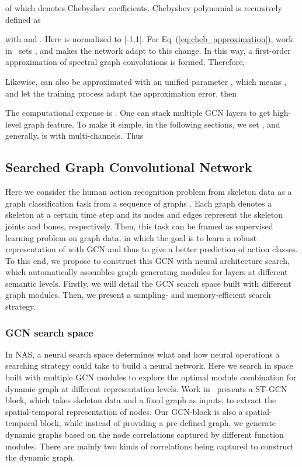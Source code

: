 \documentclass[letterpaper]{article} \usepackage{aaai19}  \usepackage{times}  \usepackage{helvet} \usepackage{courier}  \usepackage[hyphens]{url}  \usepackage{graphicx} \urlstyle{rm} \def\UrlFont{\rm}  \usepackage{graphicx}  \frenchspacing  \setlength{\pdfpagewidth}{8.5in}  \setlength{\pdfpageheight}{11in}
\begin{document}
\noindent of which  denotes Chebyshev coefficients. Chebyshev polynomial  is recursively defined as

 with  and . Here  is normalized to [-1,1]. For Eq~(\ref{eq:cheb_approximation}), work in~\cite{kipf2016semi} sets ,  and makes the network adapt to this change. In this way, a first-order approximation of spectral graph convolutions is formed. Therefore, 


\noindent Likewise,  can also be approximated with an unified parameter , which means , and let the training process adapt the approximation error, then 

The computational expense is . One can stack multiple GCN layers to get high-level graph feature. To make it simple, in the following sections, we set  , and generally,  is with multi-channels. Thus 





\subsection{Searched Graph Convolutional Network}
Here we consider the human action recognition problem from skeleton data as a graph classification task from a sequence of graphs . Each graph denotes a skeleton at a certain time step and its nodes and edges represent the skeleton joints and bones, respectively. Then, this task can be framed as supervised learning problem on graph data, in which the goal is to learn a robust representation of  with GCN and thus to give a better prediction of action classes. To this end, we propose to construct this GCN with neural architecture search, which automatically assembles graph generating modules for layers at different semantic levels. Firstly, we will detail the GCN search space built with different graph modules. Then, we present a sampling- and memory-efficient search strategy. 



\subsubsection{GCN search space}
In NAS, a neural search space determines what and how neural operations a searching strategy could take to build a neural network. Here we search in space built with multiple GCN modules to explore the optimal module combination for dynamic graph at different representation levels. Work in~\cite{yan2018stgan} presents a ST-GCN block, which takes skeleton data and a fixed graph as inputs, to extract the spatial-temporal representation of nodes. Our GCN-block is also a spatial-temporal block, while instead of providing a pre-defined graph, we generate dynamic graphs based on the node correlations captured by different function modules. There are mainly two kinds of correlations being captured to construct the dynamic graph.
\end{document}
